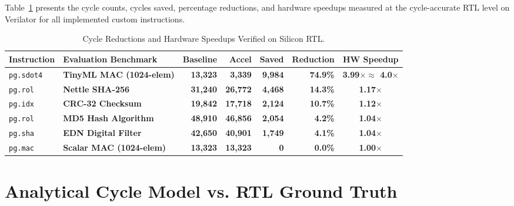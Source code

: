 \documentclass[11pt,a4paper]{article}
\begin{document}
Table~\ref{tab:custom_instructions} presents the cycle counts, cycles saved, percentage reductions, and hardware speedups measured at the cycle-accurate RTL level on Verilator for all implemented custom instructions.

\begin{table}[h!]
\centering
\small
\setlength{\tabcolsep}{5pt}
\begin{tabularx}{\textwidth}{l >{\raggedright\arraybackslash}X r r r r c}
\toprule
\textbf{Instruction} & \textbf{Evaluation Benchmark} & \textbf{Baseline} & \textbf{Accel} & \textbf{Saved} & \textbf{Reduction} & \textbf{HW Speedup} \\
\midrule
\rowcolor{green!10}\texttt{pg.sdot4} & \textbf{TinyML MAC (1024-elem)} & \textbf{13,323} & \textbf{3,339} & \textbf{9,984} & \textbf{74.9\%} & \textbf{3.99$\times \approx$ 4.0$\times$} \\
\rowcolor{blue!08}\texttt{pg.rol}   & \textbf{Nettle SHA-256}         & \textbf{31,240} & \textbf{26,772} & \textbf{4,468} & \textbf{14.3\%} & \textbf{1.17$\times$} \\
\rowcolor{blue!08}\texttt{pg.idx}   & \textbf{CRC-32 Checksum}        & \textbf{19,842} & \textbf{17,718} & \textbf{2,124} & \textbf{10.7\%} & \textbf{1.12$\times$} \\
\rowcolor{blue!08}\texttt{pg.rol}   & \textbf{MD5 Hash Algorithm}     & \textbf{48,910} & \textbf{46,856} & \textbf{2,054} & \textbf{4.2\%}  & \textbf{1.04$\times$} \\
\rowcolor{blue!08}\texttt{pg.sha}   & \textbf{EDN Digital Filter}     & \textbf{42,650} & \textbf{40,901} & \textbf{1,749} & \textbf{4.1\%}  & \textbf{1.04$\times$} \\
\midrule
\rowcolor{red!06}\texttt{pg.mac}   & \textbf{Scalar MAC (1024-elem)} & \textbf{13,323} & \textbf{13,323} & \textbf{0}     & \textbf{0.0\%}  & \textbf{1.00$\times$} \\
\bottomrule
\end{tabularx}
\caption{Cycle Reductions and Hardware Speedups Verified on Silicon RTL.}
\label{tab:custom_instructions}
\end{table}

\section{Analytical Cycle Model vs. RTL Ground Truth}
\end{document}
